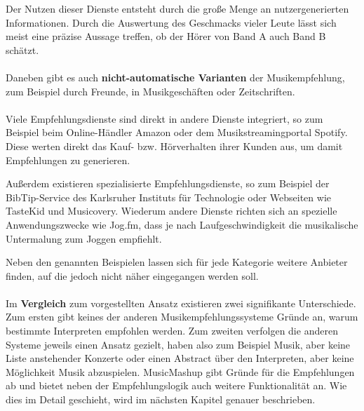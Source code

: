 Der Nutzen dieser Dienste entsteht durch die große Menge an nutzergenerierten Informationen. Durch die Auswertung des Geschmacks vieler Leute lässt sich meist eine präzise Aussage treffen, ob der Hörer von Band A auch Band B schätzt.

\paragraph{} Daneben gibt es auch \textbf{nicht-automatische Varianten} der Musikempfehlung, zum Beispiel durch Freunde, in Musikgeschäften oder Zeitschriften.

\paragraph{} Viele Empfehlungsdienste sind direkt in andere Dienste integriert, so zum Beispiel beim Online-Händler Amazon oder dem Musikstreamingportal Spotify. Diese werten direkt das Kauf- bzw. Hörverhalten ihrer Kunden aus, um damit Empfehlungen zu generieren.  

Außerdem existieren spezialisierte Empfehlungsdienste, so zum Beispiel der BibTip-Service des Karlsruher Instituts für Technologie oder Webseiten wie TasteKid und Musicovery. Wiederum andere Dienste richten sich an spezielle Anwendungszwecke wie Jog.fm, dass je nach Laufgeschwindigkeit die musikalische Untermalung zum Joggen empfiehlt.

Neben den genannten Beispielen lassen sich für jede Kategorie weitere Anbieter finden, auf die jedoch nicht näher eingegangen werden soll.

\paragraph{} Im \textbf{Vergleich} zum vorgestellten Ansatz existieren zwei signifikante Unterschiede. Zum ersten gibt keines der anderen Musikempfehlungssysteme Gründe an, warum bestimmte Interpreten empfohlen werden. Zum zweiten verfolgen die anderen Systeme jeweils einen Ansatz gezielt, haben also zum Beispiel Musik, aber keine Liste anstehender Konzerte oder einen Abstract über den Interpreten, aber keine Möglichkeit Musik abzuspielen. MusicMashup gibt Gründe für die Empfehlungen ab und bietet neben der Empfehlungslogik auch weitere Funktionalität an. Wie dies im Detail geschieht, wird im nächsten Kapitel genauer beschrieben.